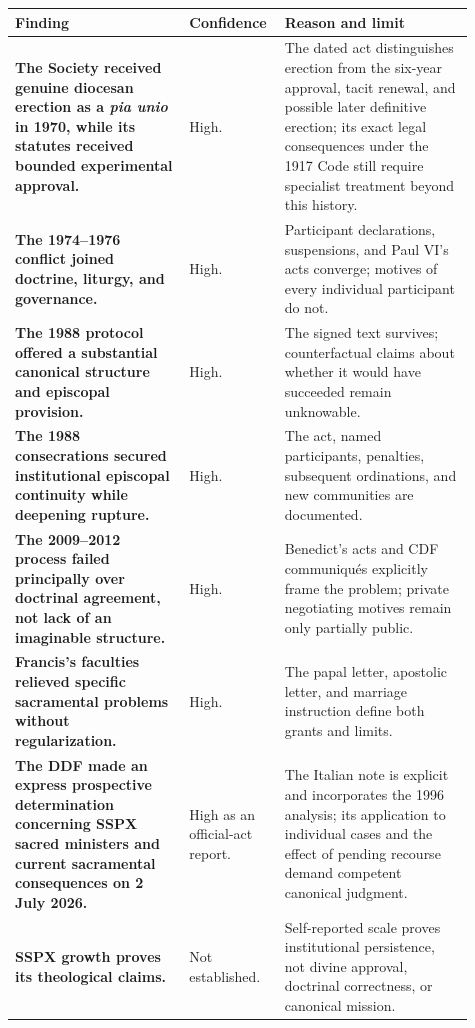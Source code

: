 \begin{longtable}{>{\bfseries\RaggedRight\arraybackslash}p{0.36\linewidth}>{\RaggedRight\arraybackslash}p{0.16\linewidth}>{\RaggedRight\arraybackslash}p{0.39\linewidth}}
\toprule
\textbf{Finding} & \textbf{Confidence} & \textbf{Reason and limit}\\
\midrule
\endhead
The Society received genuine diocesan erection as a \emph{pia unio} in 1970, while its statutes received bounded experimental approval. & High. & The dated act distinguishes erection from the six-year approval, tacit renewal, and possible later definitive erection; its exact legal consequences under the 1917 Code still require specialist treatment beyond this history.\\
The 1974--1976 conflict joined doctrine, liturgy, and governance. & High. & Participant declarations, suspensions, and Paul VI's acts converge; motives of every individual participant do not.\\
The 1988 protocol offered a substantial canonical structure and episcopal provision. & High. & The signed text survives; counterfactual claims about whether it would have succeeded remain unknowable.\\
The 1988 consecrations secured institutional episcopal continuity while deepening rupture. & High. & The act, named participants, penalties, subsequent ordinations, and new communities are documented.\\
The 2009--2012 process failed principally over doctrinal agreement, not lack of an imaginable structure. & High. & Benedict's acts and CDF communiqués explicitly frame the problem; private negotiating motives remain only partially public.\\
Francis's faculties relieved specific sacramental problems without regularization. & High. & The papal letter, apostolic letter, and marriage instruction define both grants and limits.\\
The DDF made an express prospective determination concerning SSPX sacred ministers and current sacramental consequences on 2 July 2026. & High as an official-act report. & The Italian note is explicit and incorporates the 1996 analysis; its application to individual cases and the effect of pending recourse demand competent canonical judgment.\\
SSPX growth proves its theological claims. & Not established. & Self-reported scale proves institutional persistence, not divine approval, doctrinal correctness, or canonical mission.\\
\bottomrule
\end{longtable}
